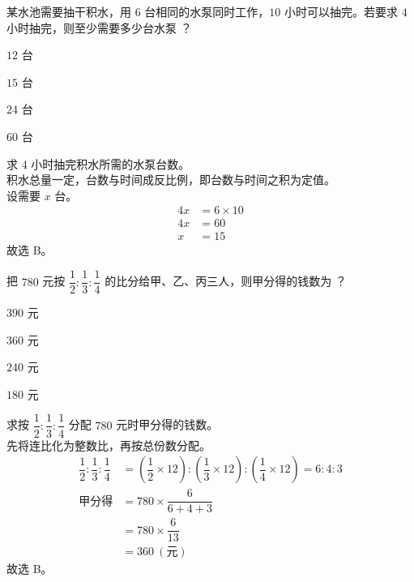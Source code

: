 \documentclass[12pt,a4paper,fontset=none]{exam-zh}
\begin{document}
\begin{question}
    某水池需要抽干积水，用 $6$ 台相同的水泵同时工作，$10$ 小时可以抽完。若要求 $4$ 小时抽完，则至少需要多少台水泵 \paren[B]？
    \begin{choices}
        \item $12$ 台
        \item $15$ 台
        \item $24$ 台
        \item $60$ 台
    \end{choices}
\end{question}

\begin{solution}
    求 $4$ 小时抽完积水所需的水泵台数。 \\
    积水总量一定，台数与时间成反比例，即台数与时间之积为定值。 \\
    设需要 $x$ 台。
    \begin{align*}
        4x &= 6\times 10 \\
        4x &= 60 \\
        x &= 15
    \end{align*}
    故选 B。
\end{solution}

\begin{question}
    把 $780$ 元按 $\dfrac{1}{2}:\dfrac{1}{3}:\dfrac{1}{4}$ 的比分给甲、乙、丙三人，则甲分得的钱数为 \paren[B]？
    \begin{choices}
        \item $390$ 元
        \item $360$ 元
        \item $240$ 元
        \item $180$ 元
    \end{choices}
\end{question}

\begin{solution}
    求按 $\dfrac{1}{2}:\dfrac{1}{3}:\dfrac{1}{4}$ 分配 $780$ 元时甲分得的钱数。 \\
    先将连比化为整数比，再按总份数分配。
    \begin{align*}
        \dfrac{1}{2}:\dfrac{1}{3}:\dfrac{1}{4} &= \left(\dfrac{1}{2}\times 12\right):\left(\dfrac{1}{3}\times 12\right):\left(\dfrac{1}{4}\times 12\right) = 6:4:3 \\
        \text{甲分得} &= 780\times\dfrac{6}{6+4+3} \\
        &= 780\times\dfrac{6}{13} \\
        &= 360\ (\text{元})
    \end{align*}
    故选 B。
\end{solution}
\end{document}
